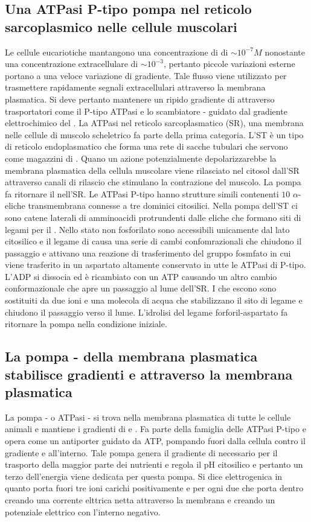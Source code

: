 \subsection{Una ATPasi P-tipo pompa  nel reticolo sarcoplasmico nelle cellule muscolari}
Le cellule eucariotiche mantangono una concentrazione di  di $\sim 10^{-7}M$ nonostante una concentrazione extracellulare di $\sim 10^{-3}$, pertanto piccole variazioni 
esterne portano a una veloce variazione di gradiente. Tale flusso viene utilizzato per trasmettere rapidamente segnali extracellulari attraverso la membrana plasmatica. Si deve pertanto
mantenere un ripido gradiente di  attraverso trasportatori come il P-tipo  ATPasi e lo scambiatore - guidato dal gradiente elettrochimico del
. La  ATPasi nel reticolo sarcoplasmatico (SR), una membrana nelle cellule di muscolo scheletrico fa parte della prima categoria. L'ST \`e un tipo di reticolo
endoplasmatico che forma una rete di sacche tubulari che servono come magazzini di . Quano un azione potenzialmente depolarizzarebbe la membrana plasmatica della cellula
muscolare  viene rilasciato nel citosol dall'SR attraverso canali di rilascio che stimulano la contrazione del muscolo. La pompa  fa ritornare il  
nell'SR. Le ATPasi P-tipo hanno strutture simili contenenti $10$ $\alpha$-eliche transmembrana connesse a tre dominici citosilici. Nella pompa dell'ST ci sono catene laterali 
di amminoacidi protrundenti dalle eliche che formano siti di legami per il . Nello stato non fosforilato sono accessibili unicamente dal lato citosilico e il legame di 
 causa una serie di cambi confomrazionali che chiudono il passaggio e attivano una reazione di trasferimento del gruppo fosmfato in cui viene trasferito in un aspartato 
altamente conservato in utte le ATPasi di P-tipo. L'ADP si dissocia ed \`e ricambiato con un ATP causando un altro cambio conformazionale che apre un passaggio al lume dell'SR. I 
 che escono sono sostituiti da due ioni  e una molecola di acqua che stabilizzano il sito di legame e chiudono il passaggio verso il lume. L'idrolisi del legame
forforil-aspartato fa ritornare la pompa nella condizione iniziale. 
\subsection{La pompa - della membrana plasmatica stabilisce gradienti  e  attraverso la membrana plasmatica}
La pompa - o ATPasi - si trova nella membrana plasmatica di tutte le cellule animali e mantiene i gradienti di  e . Fa parte della famiglia
delle ATPasi P-tipo e opera come un antiporter guidato da ATP, pompando  fuori dalla cellula contro il gradiente e  all'interno. Tale pompa genera il gradiente di 
necessario per il trasporto della maggior parte dei nutrienti e regola il pH citosilico e pertanto un terzo dell'energia viene dedicata per questa pompa. Si dice elettrogenica in quanto
porta fuori tre ioni carichi positivamente e per ogni due che porta dentro creando una corrente elttrica netta attraverso la membrana e creando un potenziale elettrico con l'interno 
negativo. 
